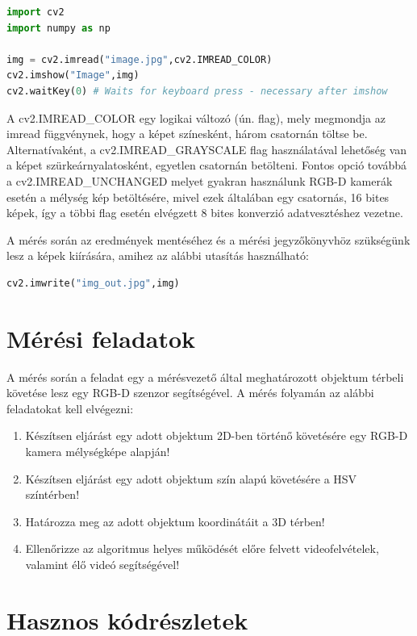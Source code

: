 \documentclass[12pt,a4paper,oneside]{report}             %
\begin{document}
\begin{lstlisting}[language=Python]
import cv2
import numpy as np

img = cv2.imread("image.jpg",cv2.IMREAD_COLOR)
cv2.imshow("Image",img)
cv2.waitKey(0) # Waits for keyboard press - necessary after imshow
\end{lstlisting}

A cv2.IMREAD\_COLOR egy logikai változó (ún. flag), mely megmondja az imread függvénynek, hogy a képet színesként, három csatornán töltse be.  Alternatívaként, a cv2.IMREAD\_GRAYSCALE flag használatával lehetőség van a képet szürkeárnyalatosként, egyetlen csatornán betölteni. Fontos opció továbbá a cv2.IMREAD\_UNCHANGED melyet gyakran használunk RGB-D kamerák esetén a mélység kép betöltésére, mivel ezek általában egy csatornás, 16 bites képek, így a többi flag esetén elvégzett 8 bites konverzió adatvesztéshez vezetne.

A mérés során az eredmények mentéséhez és a mérési jegyzőkönyvhöz szükségünk lesz a képek kiírására, amihez az alábbi utasítás használható:

\begin{lstlisting}[language=Python]
cv2.imwrite("img_out.jpg",img)
\end{lstlisting}

\chapter{Mérési feladatok}

A mérés során a feladat egy a mérésvezető által meghatározott objektum térbeli követése lesz egy RGB-D szenzor segítségével. A mérés folyamán az alábbi feladatokat kell elvégezni:

\begin{enumerate}
\item Készítsen eljárást egy adott objektum 2D-ben történő követésére egy RGB-D kamera mélységképe alapján!
\item Készítsen eljárást egy adott objektum szín alapú követésére a HSV színtérben!
\item Határozza meg az adott objektum koordinátáit a 3D térben!
\item Ellenőrizze az algoritmus helyes működését előre felvett videofelvételek, valamint élő videó segítségével!
\end{enumerate}

\chapter{Hasznos kódrészletek}
\end{document}
